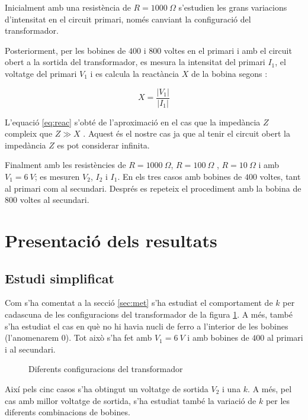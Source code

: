 Inicialment amb una resistència de $R=\SI{1000}{\Omega}$ s'estudien les grans variacions d'intensitat en el circuit primari, només canviant la configuració del transformador. 

Posteriorment, per les bobines de $400$ i $800$ voltes en el primari i amb el circuit obert a la sortida del transformador, es mesura  la intensitat del primari $I_1$, el voltatge del primari $V_1$ i es calcula la reactància $X$ de la bobina segons :

\begin{equation}\label{eq:reac}
    X=\frac{|V_1|}{|I_1|}
\end{equation}

L'equació \cref{eq:reac} s'obté de l'aproximació en el cas que la impedància $Z$ compleix que $Z \gg X$ . Aquest és el nostre cas ja que al tenir el circuit obert la impedància $Z$ es pot considerar infinita. 

Finalment amb les resistències de $R=\SI{1000}{\Omega}$, $R=\SI{100}{\Omega}$ , $R=\SI{10}{\Omega}$ i amb $V_1=\SI{6}{V}$; es mesuren $V_2$, $I_2$ i $I_1$. En els tres casos amb bobines de $400$ voltes, tant al primari com al secundari. Després es repeteix el procediment amb la bobina de $800$ voltes al secundari.


\section{Presentació dels resultats}
\subsection{Estudi simplificat}

Com s'ha comentat a la secció \cref{sec:met} s'ha estudiat el comportament de $k$ per cadascuna de les configuracions del transformador de la figura \cref{fig:transfs}.
A més, també s'ha estudiat el cas en què no hi havia nucli de ferro a l'interior de les bobines (l'anomenarem $0$). Tot això s'ha fet amb $V_1=\SI{6}{V}$ i amb bobines de $400$ al primari i al secundari.

\begin{figure}
    \centering \small \sffamily
    \caption{Diferents configuracions del transformador}
    \label{fig:transfs}
\end{figure}

Així pels cinc casos s'ha obtingut un voltatge de sortida $V_2$ i una $k$. A més, pel cas amb millor voltatge de sortida, s'ha estudiat també la variació de $k$ per les diferents combinacions de bobines.


